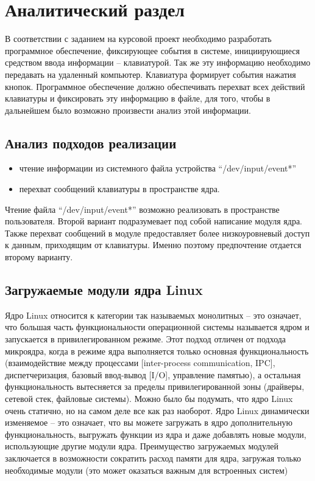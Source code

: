 \chapter{Аналитический раздел}
\label{cha:analysis}
%
%
В соответствии с заданием на курсовой проект необходимо разработать программное
обеспечение, фиксирующее события в системе, инициирующиеся средством ввода информации –
клавиатурой. Так же эту информацию необходимо передавать на удаленный компьютер.
Клавиатура формирует события нажатия кнопок.
Программное обеспечение должно обеспечивать перехват всех действий клавиатуры и
фиксировать эту информацию в файле, для того, чтобы в дальнейшем было возможно произвести
анализ этой информации. 





\section{Анализ подходов реализации}

\begin{itemize}
	\item чтение информации из системного файла устройства “/dev/input/event*”
	\item перехват сообщений клавиатуры в пространстве ядра.
	\end{itemize}
Чтение файла “/dev/input/event*” возможно реализовать в пространстве пользователя. Второй вариант подразумевает под собой написание модуля ядра.
Также перехват сообщений в модуле предоставляет более низкоуровневый доступ к данным,
приходящим от клавиатуры. Именно поэтому предпочтение отдается второму варианту. 

\section{Загружаемые модули ядра Linux }
Ядро Linux относится к категории так называемых монолитных – это означает, что большая часть функциональности операционной системы называется ядром и запускается в привилегированном режиме. Этот подход отличен от подхода микроядра, когда в режиме ядра выполняется только основная функциональность (взаимодействие между процессами [inter-process communication, IPC], диспетчеризация, базовый ввод-вывод [I/O], управление памятью), а остальная функциональность вытесняется за пределы привилегированной зоны (драйверы, сетевой стек, файловые системы). Можно было бы подумать, что ядро Linux очень статично, но на самом деле все как раз наоборот.
Ядро Linux динамически изменяемое – это означает, что вы можете загружать в ядро дополнительную функциональность, выгружать функции из ядра и даже добавлять новые модули, использующие другие модули ядра. Преимущество загружаемых модулей заключается в возможности сократить расход памяти для ядра, загружая только необходимые модули (это может оказаться важным для встроенных систем) \cite{book4}

